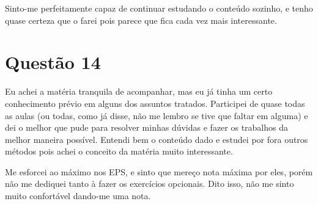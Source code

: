 \documentclass[11pt]{article}
\begin{document}
Sinto-me perfeitamente capaz de continuar estudando o conteúdo sozinho,
e tenho quase certeza que o farei pois parece que fica cada vez mais 
interessante.

\section{Questão 14}
\label{sec:orgc4e02c6}
Eu achei a matéria tranquila de acompanhar, mas eu já tinha um certo
conhecimento prévio em alguns dos assuntos tratados. Participei de quase
todas as aulas (ou todas, como já disse, não me lembro se tive que faltar
em alguma) e dei o melhor que pude para resolver minhas dúvidas e fazer
os trabalhos da melhor maneira possível. Entendi bem o conteúdo dado 
e estudei por fora outros métodos pois achei o conceito da matéria muito
interessante.

Me esforcei ao máximo nos EPS, e sinto que mereço nota máxima por eles,
porém não me dediquei tanto à fazer os exercícios opcionais. Dito isso,
não me sinto muito confortável dando-me uma nota.
\end{document}
